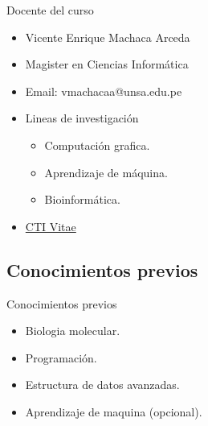 \documentclass[10pt]{beamer}
\newcommand{\chref}[2]{	\href{#1}{{\usebeamercolor[bg]{Feather}#2}} }
\newcommand{\chref}[3][blue]{\href{#2}{\color{#1}{#3}}}%
\newcommand{\1}{
        	\setbeamertemplate{background}{
        		\texttt{[image: img/1]}
        		\tikz[overlay] \fill[fill opacity=0.75,fill=white] (0,0) rectangle (-\paperwidth,\paperheight);
        	}
}
\begin{document}
\begin{frame}{Docente del curso}{}
\begin{itemize}
	\item Vicente Enrique Machaca Arceda
	\item Magister en Ciencias Informática
	\item Email: vmachacaa@unsa.edu.pe
	\item Lineas de investigación
	
		\begin{itemize}
			\item Computación grafica.
			\item Aprendizaje de máquina.
			\item Bioinformática.	
		\end{itemize}
	
	\item  \chref{http://directorio.concytec.gob.pe/appDirectorioCTI/VerDatosInvestigador.do?id_investigador=22551}{CTI Vitae}
\end{itemize}
\end{frame}


\subsection{Conocimientos previos}

\begin{frame}{Conocimientos previos}{}	
\begin{itemize}
	\item Biologia molecular.
	\item Programación.
	\item Estructura de datos avanzadas.
	\item Aprendizaje de maquina (opcional).	
\end{itemize}
\end{frame}
\end{document}
